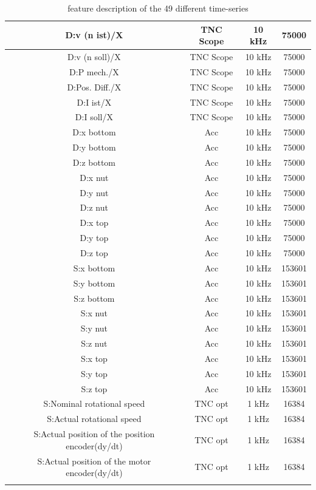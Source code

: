 \begin{center}
\begin{longtable}{||c c c c||}
 \hline
 D:v (n ist)/X & TNC Scope & 10 kHz & 75000 \\ 
 \hline
 D:v (n soll)/X & TNC Scope & 10 kHz & 75000 \\ 
 \hline
 D:P mech./X & TNC Scope & 10 kHz & 75000 \\ 
 \hline
 D:Pos. Diff./X & TNC Scope & 10 kHz & 75000 \\ 
  \hline
 D:I ist/X & TNC Scope & 10 kHz & 75000 \\ 
 \hline
 D:I soll/X & TNC Scope & 10 kHz & 75000 \\ 
 \hline
 D:x bottom & Acc & 10 kHz & 75000 \\ 
  \hline
 D:y bottom & Acc & 10 kHz & 75000 \\ 
 \hline
 D:z bottom & Acc & 10 kHz & 75000 \\ 
 \hline
 D:x nut & Acc & 10 kHz & 75000 \\ 
 \hline
 D:y nut & Acc & 10 kHz & 75000 \\ 
 \hline
 D:z nut & Acc & 10 kHz & 75000 \\ 
 \hline
 D:x top & Acc & 10 kHz & 75000 \\
  \hline
 D:y top & Acc & 10 kHz & 75000 \\ 
 \hline
 D:z top & Acc & 10 kHz & 75000 \\ 
 \hline
 S:x bottom & Acc & 10 kHz & 153601 \\ 
 \hline
 S:y bottom & Acc & 10 kHz & 153601 \\ 
 \hline
 S:z bottom & Acc & 10 kHz & 153601 \\ 
 \hline
 S:x nut & Acc & 10 kHz & 153601 \\ 
  \hline
 S:y nut & Acc & 10 kHz & 153601 \\ 
 \hline
 S:z nut & Acc & 10 kHz & 153601 \\ 
 \hline
 S:x top & Acc & 10 kHz & 153601 \\ 
 \hline
 S:y top & Acc & 10 kHz & 153601 \\ 
 \hline
 S:z top & Acc & 10 kHz & 153601 \\ 
 \hline
 S:Nominal rotational speed & TNC opt & 1 kHz & 16384 \\
  \hline
 S:Actual rotational speed & TNC opt & 1 kHz & 16384 \\ 
 \hline
 S:Actual position of the position encoder(dy/dt) & TNC opt & 1 kHz & 16384 \\ 
 \hline
 S:Actual position of the motor encoder(dy/dt)  & TNC opt & 1 kHz & 16384  \\ [1ex] 
 \hline
\caption {feature description of the 49 different time-series}
\label {tab:description_of_the_49_recorded_features}
\end{longtable}
\end{center}

